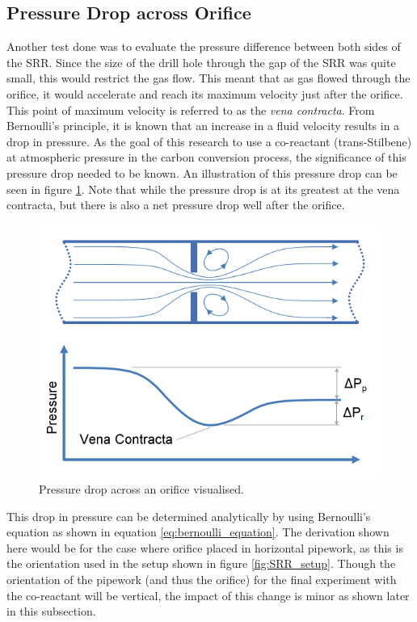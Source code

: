 \subsection{Pressure Drop across Orifice}

Another test done was to evaluate the pressure difference between both sides of the SRR. Since the size of the drill hole through the gap of the SRR was quite small, this would restrict the gas flow. This meant that as gas flowed through the orifice, it would accelerate and reach its maximum velocity just after the orifice. This point of maximum velocity is referred to as the \textit{vena contracta}. From Bernoulli's principle, it is known that an increase in a fluid velocity results in a drop in pressure. As the goal of this research to use  a co-reactant (trans-Stilbene) at atmospheric pressure in the carbon conversion process, the significance of this pressure drop needed to be known. An illustration of this pressure drop can be seen in figure \ref{fig:orifice_vena_contracta}. Note that while the pressure drop is at its greatest at the vena contracta, but there is also a net pressure drop well after the orifice.

\begin{figure}[h!]
	\centering
	\includegraphics[width=0.75\linewidth]{chapter_4/figures/orifice-vena-contracta.png}
	\caption{Pressure drop across an orifice visualised. \cite{Neutrium}}
	\label{fig:orifice_vena_contracta}
\end{figure}

This drop in pressure can be determined analytically by using Bernoulli's equation as shown in equation \ref{eq:bernoulli_equation}. The derivation shown here would be for the case where orifice placed in horizontal pipework, as this is the orientation used in the setup shown in figure \ref{fig:SRR_setup}. Though the orientation of the pipework (and thus the orifice) for the final experiment with the co-reactant will be vertical, the impact of this change is minor as shown later in this subsection.

